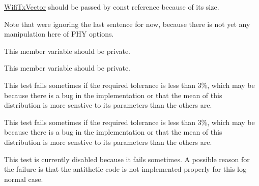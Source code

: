 \begin{DoxyRefList}
\item[\label{todo__todo000177}%
\hypertarget{todo__todo000177}{}%
Member \hyperlink{classns3_1_1WifiPhy_a34ea6a73f51ab1ab236211e44bae14e4}{ns3\+:\+:Wifi\+Phy\+:\+:Monitor\+Sniffer\+Tx\+Callback} )(const Ptr$<$ const Packet $>$ packet, uint16\+\_\+t channel\+Freq\+Mhz, \hyperlink{classns3_1_1WifiTxVector}{Wifi\+Tx\+Vector} tx\+Vector, \hyperlink{structns3_1_1MpduInfo}{Mpdu\+Info} a\+Mpdu)]\hyperlink{classns3_1_1WifiTxVector}{Wifi\+Tx\+Vector} should be passed by const reference because of its size.  
\item[\label{todo__todo000180}%
\hypertarget{todo__todo000180}{}%
Member \hyperlink{classns3_1_1WifiRemoteStationManager_aa39d276e0171076b7ebc98b5cb8b0947}{ns3\+:\+:Wifi\+Remote\+Station\+Manager\+:\+:Get\+Control\+Answer\+Mode} (\hyperlink{classns3_1_1Mac48Address}{Mac48\+Address} address, \hyperlink{classns3_1_1WifiMode}{Wifi\+Mode} req\+Mode)]Note that we\textquotesingle{}re ignoring the last sentence for now, because there is not yet any manipulation here of P\+HY options.  
\item[\label{todo__todo000183}%
\hypertarget{todo__todo000183}{}%
Member \hyperlink{classns3_1_1WimaxNetDevice_a88710ac8dd5cdcee795372c5722be86e}{ns3\+:\+:Wimax\+Net\+Device\+:\+:m\+\_\+trace\+Rx} ]This member variable should be private.  
\item[\label{todo__todo000184}%
\hypertarget{todo__todo000184}{}%
Member \hyperlink{classns3_1_1WimaxNetDevice_a8fcb2352790f8cc4b34adbb1a359fa97}{ns3\+:\+:Wimax\+Net\+Device\+:\+:m\+\_\+trace\+Tx} ]This member variable should be private.  
\item[\label{todo__todo000010}%
\hypertarget{todo__todo000010}{}%
Member \hyperlink{classRandomVariableStreamLogNormalAntitheticTestCase_a723deffbfad7dbfbeecee15109aa20fc}{Random\+Variable\+Stream\+Log\+Normal\+Antithetic\+Test\+Case\+:\+:Do\+Run} (void)]This test fails sometimes if the required tolerance is less than 3\%, which may be because there is a bug in the implementation or that the mean of this distribution is more senstive to its parameters than the others are.  
\item[\label{todo__todo000009}%
\hypertarget{todo__todo000009}{}%
Member \hyperlink{classRandomVariableStreamLogNormalTestCase_ab6ee956d829eb26ba949e3a4d99c6996}{Random\+Variable\+Stream\+Log\+Normal\+Test\+Case\+:\+:Do\+Run} (void)]This test fails sometimes if the required tolerance is less than 3\%, which may be because there is a bug in the implementation or that the mean of this distribution is more senstive to its parameters than the others are.  
\item[\label{todo__todo000011}%
\hypertarget{todo__todo000011}{}%
Member \hyperlink{classRandomVariableStreamTestSuite_a1ff06669b565f1dd6034150ea8ba7b2a}{Random\+Variable\+Stream\+Test\+Suite\+:\+:Random\+Variable\+Stream\+Test\+Suite} ()]This test is currently disabled because it fails sometimes. A possible reason for the failure is that the antithetic code is not implemented properly for this log-\/normal case. 


\end{DoxyRefList}
